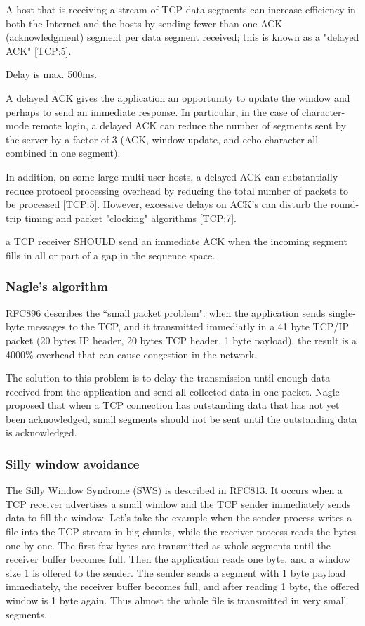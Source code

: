 
A host that is receiving a stream of TCP data segments can
increase efficiency in both the Internet and the hosts by
sending fewer than one ACK (acknowledgment) segment per data
segment received; this is known as a "delayed ACK" [TCP:5].

Delay is max. 500ms.

A delayed ACK gives the application an opportunity to
update the window and perhaps to send an immediate
response.  In particular, in the case of character-mode
remote login, a delayed ACK can reduce the number of
segments sent by the server by a factor of 3 (ACK,
window update, and echo character all combined in one
segment).

In addition, on some large multi-user hosts, a delayed
ACK can substantially reduce protocol processing
overhead by reducing the total number of packets to be
processed [TCP:5].  However, excessive delays on ACK's
can disturb the round-trip timing and packet "clocking"
algorithms [TCP:7].


a TCP receiver SHOULD send an immediate ACK
when the incoming segment fills in all or part of a gap in the
sequence space.

\subsubsection*{Nagle's algorithm}

RFC896 describes the ``small packet problem": when the application
sends single-byte messages to the TCP, and it transmitted immediatly
in a 41 byte TCP/IP packet (20 bytes IP header, 20 bytes TCP header,
1 byte payload), the result is a 4000\% overhead that can cause
congestion in the network.

The solution to this problem is to delay the transmission until
enough data received from the application and send all collected
data in one packet. Nagle proposed that
when a TCP connection has outstanding data that has not
yet been acknowledged, small segments should not be sent
until the outstanding data is acknowledged.

\subsubsection*{Silly window avoidance}

The Silly Window Syndrome (SWS) is described in RFC813. It occurs when
a TCP receiver advertises a small window and the TCP sender immediately
sends data to fill the window. Let's take the example when the sender
process writes a file into the TCP stream in big chunks, while the
receiver process reads the bytes one by one. The first few bytes
are transmitted as whole segments until the receiver buffer
becomes full. Then the application reads one
byte, and a window size 1 is offered to the sender. The sender sends
a segment with 1 byte payload immediately, the receiver buffer becomes
full, and after reading 1 byte, the offered window is 1 byte again.
Thus almost the whole file is transmitted in very small segments.

